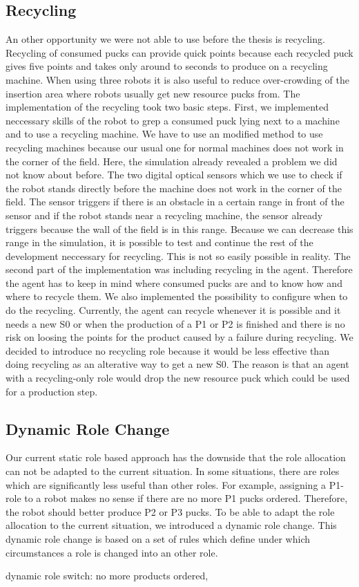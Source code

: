 \subsection{Recycling}
An other opportunity we were not able to use before the thesis is recycling. Recycling of consumed pucks can provide quick points because each recycled puck gives five points and takes only around to seconds to produce on a recycling machine. When using three robots it is also useful to reduce over-crowding of the insertion area where robots usually get new resource pucks from. The implementation of the recycling took two basic steps. First, we implemented neccessary skills of the robot to grep a consumed puck lying next to a machine and to use a recycling machine. We have to use an modified method to use recycling machines because our usual one for normal machines does not work in the corner of the field. Here, the simulation already revealed a problem we did not know about before. The two digital optical sensors which we use to check if the robot stands directly before the machine does not work in the corner of the field. The sensor triggers if there is an obstacle in a certain range in front of the sensor and if the robot stands near a recycling machine, the sensor already triggers because the wall of the field is in this range. Because we can decrease this range in the simulation, it is possible to test and continue the rest of the development neccessary for recycling. This is not so easily possible in reality. The second part of the implementation was including recycling in the agent. Therefore the agent has to keep in mind where consumed pucks are and to know how and where to recycle them. We also implemented the possibility to configure when to do the recycling. Currently, the agent can recycle whenever it is possible and it needs a new S0 or when the production of a P1 or P2 is finished and there is no risk on loosing the points for the product caused by a failure during recycling. We decided to introduce no recycling role because it would be less effective than doing recycling as an alterative way to get a new S0. The reason is that an agent with a recycling-only role would drop the new resource puck which could be used for a production step.

\subsection{Dynamic Role Change}
Our current static role based approach has the downside that the role allocation can not be adapted to the current situation. In some situations, there are roles which are significantly less useful than other roles. For example, assigning a P1-role to a robot makes no sense if there are no more P1 pucks ordered. Therefore, the robot should better produce P2 or P3 pucks. To be able to adapt the role allocation to the current situation, we introduced a dynamic role change. This dynamic role change is based on a set of rules which define under which circumstances a role is changed into an other role.

dynamic role switch: no more products ordered, \cite{dynamic_role_assignment}


